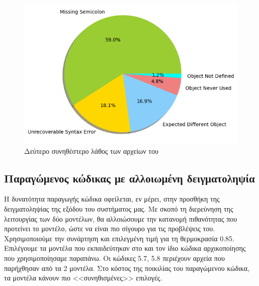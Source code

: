 \begin{figure}
	\caption{Δεύτερο συνηθέστερο λάθος των αρχείων του }
	\label{MCE2-npmlabeled}
	\includegraphics[width=\textwidth, keepaspectratio]{images/MCE2-npmlabeled.png}
\end{figure}

\pagebreak 

\subsection{ Παραγώμενος κώδικας με αλλοιωμένη δειγματοληψία}

Η δυνατότητα παραγωγής κώδικα οφείλεται, εν μέρει, στην προσθήκη της δειγματοληψίας της εξόδου του συστήματος μας. Με σκοπό τη διερεύνηση της λειτουργίας των δύο μοντέλων, θα αλλοιώσουμε την κατανομή πιθανότητας που προτείνει το μοντέλο, ώστε να είναι πιο σίγουρο για τις προβλέψεις του. Χρησιμοποιούμε την συνάρτηση  και επιλεγμένη τιμή για τη θερμοκρασία  0.85. Επιλέγουμε τα μοντέλα που εκπαιδεύτηκαν στο  και τον ίδιο κώδικα αρχικοποίησης που χρησιμοποίησαμε παραπάνω. Οι κώδικες 5.7, 5.8 περιέχουν αρχεία που παρήχθησαν από τα 2 μοντέλα. Στο κόστος της ποικιλίας του παραγώμενου κώδικα, τα μοντέλα κάνουν πιο <<συνηθισμένες>> επιλογές.   



\pagebreak



